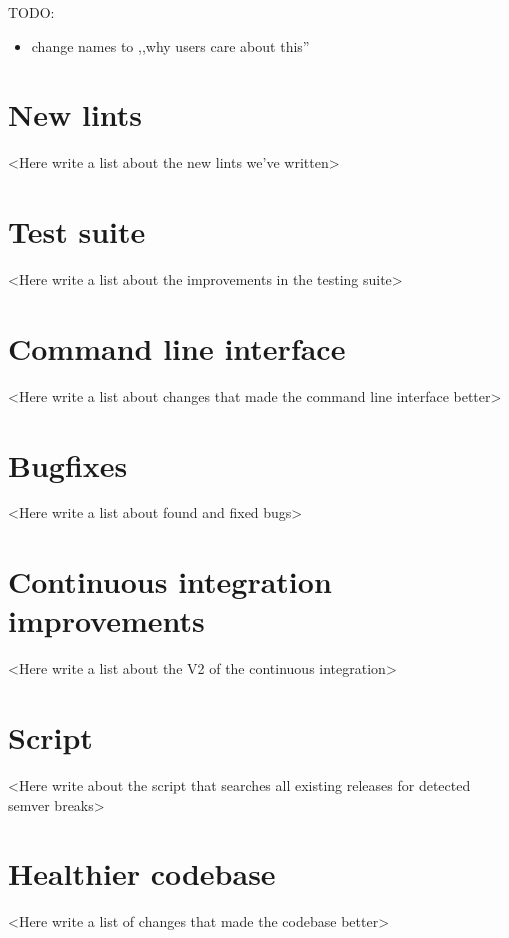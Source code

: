 \documentclass[licencjacka,en]{pracamgr}
\begin{document}
TODO:
\begin{itemize}
	\item change names to ,,why users care about this''
\end{itemize}

\section{New lints}

<Here write a list about the new lints we've written>

\section{Test suite}

<Here write a list about the improvements in the testing suite>

\section{Command line interface}

<Here write a list about changes that made the command line interface better>

\section{Bugfixes}

<Here write a list about found and fixed bugs>

\section{Continuous integration improvements}

<Here write a list about the V2 of the continuous integration>

\section{Script}

<Here write about the script that searches all existing releases for detected semver breaks>

\section{Healthier codebase}

<Here write a list of changes that made the codebase better>

\end{document}
